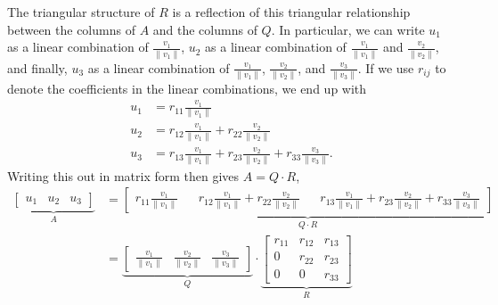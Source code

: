 The triangular structure of $R$ is a reflection of this triangular relationship between the columns of $A$ and the columns of $Q$. In particular, we can write $u_1$ as a linear combination of $\frac{v_1}{\| v_1 \|}$, $u_2$ as a linear combination of $\frac{v_1}{\| v_1 \|}$ and $\frac{v_2}{\| v_2 \|}$, and finally, 
$u_3$ as a linear combination of $\frac{v_1}{\| v_1 \|}$, $\frac{v_2}{\| v_2 \|}$, and $\frac{v_3}{\| v_3 \|}$. If we use $r_{ij}$ to denote the coefficients in the linear combinations, we end up with
\begin{align*}
u_1 &= r_{11}  \frac{v_1}{\| v_1 \|} \\
u_2 &=  r_{12}  \frac{v_1}{\| v_1 \|} +  r_{22}  \frac{v_2}{\| v_2 \|}\\
u_3 &=  r_{13}  \frac{v_1}{\| v_1 \|} +  r_{23}  \frac{v_2}{\| v_2 \|} + 
r_{33} \frac{v_3}{\| v_3 \|}.
\end{align*}
Writing this out in matrix form then gives $A = Q \cdot R$,
\begin{align*}	\underbrace{\left[ \begin{array}{ccc}u_1 & u_2 & u_3 \end{array} \right]}_{A} &= \underbrace{\left[ \begin{array}{ccccc}r_{11}  \frac{v_1}{\| v_1 \|} & &
 r_{12}  \frac{v_1}{\| v_1 \|} +  r_{22}  \frac{v_2}{\| v_2 \|}
& & r_{13}  \frac{v_1}{\| v_1 \|} +  r_{23}  \frac{v_2}{\| v_2 \|} + 
r_{33} \frac{v_3}{\| v_3 \|} \end{array} \right]}_{Q\cdot R} \\
&= 
%
\underbrace{\left[ \begin{array}{ccc}\frac{v_1}{\| v_1 \|} 
& \frac{v_2}{\| v_2 \|}
&   \frac{v_3}{\| v_3 \|} \end{array} \right]}_{Q} \cdot 
\underbrace{\left[ \begin{array}{ccc}r_{11} & r_{12} & r_{13} \\
0 & r_{22} & r_{23} \\
0 & 0 & r_{33} \end{array} \right]}_{R}
\end{align*}

